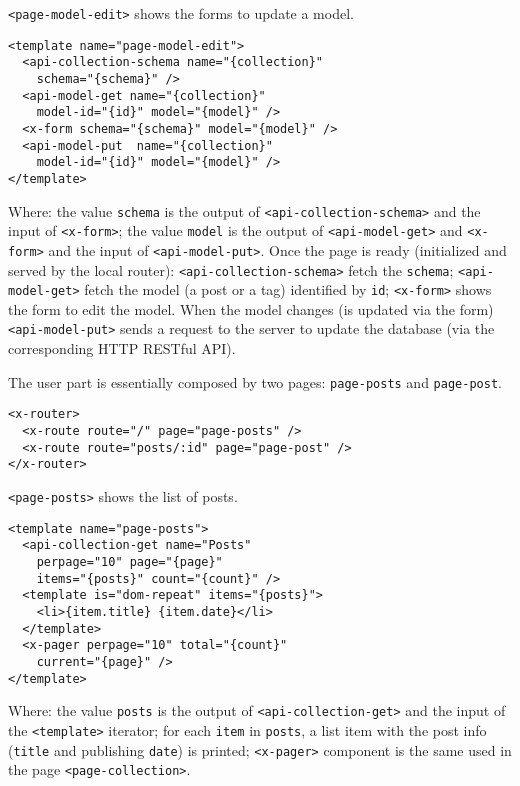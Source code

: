 \vspace{0.2cm}

\texttt{<page-model-edit>} shows the forms to update a model.

\begin{lstlisting}[language=HTML5]
<template name="page-model-edit">
  <api-collection-schema name="{collection}"
    schema="{schema}" />
  <api-model-get name="{collection}" 
    model-id="{id}" model="{model}" />
  <x-form schema="{schema}" model="{model}" />
  <api-model-put  name="{collection}"
    model-id="{id}" model="{model}" />
</template>
\end{lstlisting}

Where: 
the value \texttt{schema} is the output of \texttt{<api-collection-schema>} and the input of \texttt{<x-form>};
the value \texttt{model} is the output of \texttt{<api-model-get>} and \texttt{<x-form>} and the input of \texttt{<api-model-put>}.
Once the page is ready (initialized and served by the local router): 
\texttt{<api-collection-schema>} fetch the \texttt{schema}; 
\texttt{<api-model-get>} fetch the model (a post or a tag) identified by \texttt{id};
\texttt{<x-form>} shows the form to edit the model.
When the model changes (is updated via the form) \texttt{<api-model-put>} sends a request to the server to update the database (via the corresponding HTTP RESTful API).


The user part is essentially composed by two pages: \texttt{page-posts} and \texttt{page-post}.

\begin{lstlisting}[language=HTML5]
<x-router>
  <x-route route="/" page="page-posts" />
  <x-route route="posts/:id" page="page-post" />
</x-router>
\end{lstlisting}

\texttt{<page-posts>} shows the list of posts.

\begin{lstlisting}[language=HTML5]
<template name="page-posts">
  <api-collection-get name="Posts"
    perpage="10" page="{page}" 
    items="{posts}" count="{count}" />
  <template is="dom-repeat" items="{posts}">
    <li>{item.title} {item.date}</li>
  </template>
  <x-pager perpage="10" total="{count}" 
    current="{page}" />
</template>
\end{lstlisting}

Where:
the value \texttt{posts} is the output of \texttt{<api-collection-get>} and the input of the \texttt{<template>} iterator; for each \texttt{item} in \texttt{posts}, a list item with the post info (\texttt{title} and publishing \texttt{date}) is printed;
\texttt{<x-pager>} component is the same used in the page \texttt{<page-collection>}.

